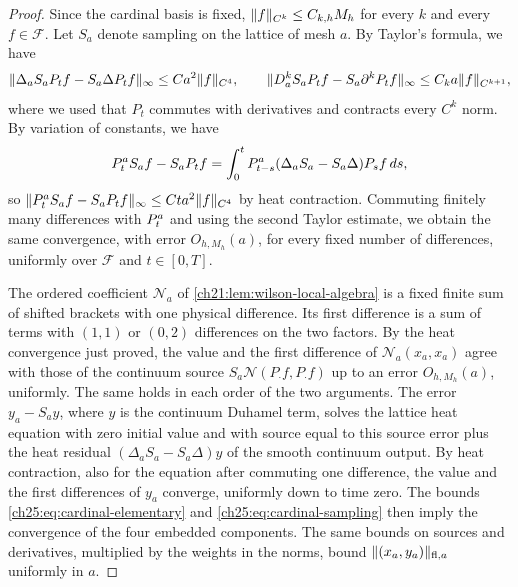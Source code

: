 \begin{proof}
Since the cardinal basis is fixed, $\lVert f\rVert_{C^k}\le C_{k,h}M_h$ for every $k$ and every $f\in\mathscr F$. Let $S_a$ denote sampling on the lattice of mesh $a$. By Taylor's formula, we have
\[
 \lVert \Delta_aS_aP_tf-S_a\Delta P_tf\rVert_\infty\le Ca^2\lVert f\rVert_{C^4},\qquad
 \lVert D_a^kS_aP_tf-S_a\partial^kP_tf\rVert_\infty\le C_ka\lVert f\rVert_{C^{k+1}},
\]
where we used that $P_t$ commutes with derivatives and contracts every $C^k$ norm. By variation of constants, we have
\[
 P_{t}^{a}S_af-S_aP_tf=\int_0^tP_{t-s}^{a}(\Delta_aS_a-S_a\Delta)P_sf\,ds,
\]
so $\lVert P_{t}^{a}S_af-S_aP_tf\rVert_\infty\le Cta^2\lVert f\rVert_{C^4}$ by heat contraction. Commuting finitely many differences with $P_{t}^{a}$ and using the second Taylor estimate, we obtain the same convergence, with error $O_{h,M_h}(a)$, for every fixed number of differences, uniformly over $\mathscr F$ and $t\in[0,T]$.

The ordered coefficient $\mathcal N_a$ of \cref{ch21:lem:wilson-local-algebra} is a fixed finite sum of shifted brackets with one physical difference. Its first difference is a sum of terms with $(1,1)$ or $(0,2)$ differences on the two factors. By the heat convergence just proved, the value and the first difference of $\mathcal N_a(x_a,x_a)$ agree with those of the continuum source $S_a\mathcal N(P_\cdot f,P_\cdot f)$ up to an error $O_{h,M_h}(a)$, uniformly. The same holds in each order of the two arguments. The error $y_a-S_ay$, where $y$ is the continuum Duhamel term, solves the lattice heat equation with zero initial value and with source equal to this source error plus the heat residual $(\Delta_aS_a-S_a\Delta)y$ of the smooth continuum output. By heat contraction, also for the equation after commuting one difference, the value and the first differences of $y_a$ converge, uniformly down to time zero. The bounds \eqref{ch25:eq:cardinal-elementary} and \eqref{ch25:eq:cardinal-sampling} then imply the convergence of the four embedded components. The same bounds on sources and derivatives, multiplied by the weights in the norms, bound $\lVert (x_a,y_a)\rVert_{\mathrm{fl},a}$ uniformly in $a$.


\end{proof}
